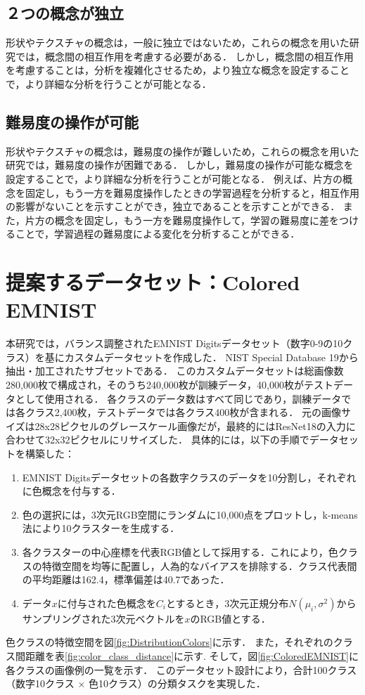 \subsection{２つの概念が独立}
形状やテクスチャの概念は，一般に独立ではないため，これらの概念を用いた研究では，概念間の相互作用を考慮する必要がある．
しかし，概念間の相互作用を考慮することは，分析を複雑化させるため，より独立な概念を設定することで，より詳細な分析を行うことが可能となる．

\subsection{難易度の操作が可能}
形状やテクスチャの概念は，難易度の操作が難しいため，これらの概念を用いた研究では，難易度の操作が困難である．
しかし，難易度の操作が可能な概念を設定することで，より詳細な分析を行うことが可能となる．
例えば、片方の概念を固定し，もう一方を難易度操作したときの学習過程を分析すると，相互作用の影響がないことを示すことができ，独立であることを示すことができる．
また，片方の概念を固定し，もう一方を難易度操作して，学習の難易度に差をつけることで，学習過程の難易度による変化を分析することができる．

\newpage

\section{提案するデータセット：Colored EMNIST}
本研究では，バランス調整されたEMNIST Digitsデータセット（数字0-9の10クラス）\cite{cohen2017emnist}を基にカスタムデータセットを作成した．
NIST Special Database 19から抽出・加工されたサブセットである．
このカスタムデータセットは総画像数280,000枚で構成され，そのうち240,000枚が訓練データ，40,000枚がテストデータとして使用される．
各クラスのデータ数はすべて同じであり，訓練データでは各クラス2,400枚，テストデータでは各クラス400枚が含まれる．
元の画像サイズは28x28ピクセルのグレースケール画像だが，最終的にはResNet18の入力に合わせて32x32ピクセルにリサイズした．
具体的には，以下の手順でデータセットを構築した：

\begin{enumerate}
    \item EMNIST Digitsデータセットの各数字クラスのデータを10分割し，それぞれに色概念を付与する．
    \item 色の選択には，3次元RGB空間にランダムに10,000点をプロットし，k-means法により10クラスターを生成する．
    \item 各クラスターの中心座標を代表RGB値として採用する．これにより，色クラスの特徴空間を均等に配置し，人為的なバイアスを排除する．クラス代表間の平均距離は162.4，標準偏差は40.7であった．
    \item データ$x$に付与された色概念を$C_i$とするとき，3次元正規分布$N(\mu_i, \sigma^2)$からサンプリングされた3次元ベクトルを$x$のRGB値とする．
\end{enumerate}
色クラスの特徴空間を図\ref{fig:DistributionColors}に示す．
また，それぞれのクラス間距離を表\ref{fig:color_class_distance}に示す.
そして，図\ref{fig:ColoredEMNIST}に各クラスの画像例の一覧を示す．
このデータセット設計により，合計100クラス（数字10クラス × 色10クラス）の分類タスクを実現した．

